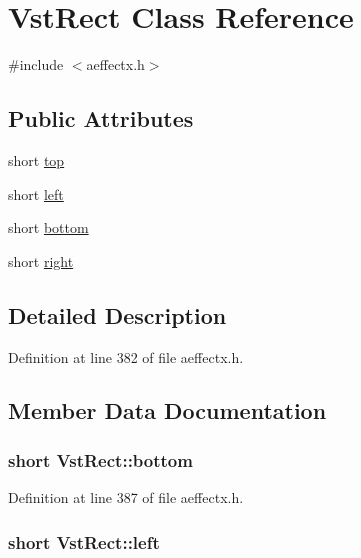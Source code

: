 \hypertarget{class_vst_rect}{}\section{Vst\+Rect Class Reference}
\label{class_vst_rect}


{\ttfamily \#include $<$aeffectx.\+h$>$}

\subsection*{Public Attributes}
\begin{DoxyCompactItemize}
\item 
short \hyperlink{class_vst_rect_a7f8eed550cd4a163997947b9840e6c69}{top}
\item 
short \hyperlink{class_vst_rect_a3659d8ec09583bb2e3f16c3f3e22b923}{left}
\item 
short \hyperlink{class_vst_rect_ae42659a383b39892184adf98f207da76}{bottom}
\item 
short \hyperlink{class_vst_rect_a134a7aa919791f2ffaad850853e0751d}{right}
\end{DoxyCompactItemize}


\subsection{Detailed Description}


Definition at line 382 of file aeffectx.\+h.



\subsection{Member Data Documentation}
\subsubsection[{\texorpdfstring{bottom}{bottom}}]{\setlength{\rightskip}{0pt plus 5cm}short Vst\+Rect\+::bottom}\hypertarget{class_vst_rect_ae42659a383b39892184adf98f207da76}{}\label{class_vst_rect_ae42659a383b39892184adf98f207da76}


Definition at line 387 of file aeffectx.\+h.

\subsubsection[{\texorpdfstring{left}{left}}]{\setlength{\rightskip}{0pt plus 5cm}short Vst\+Rect\+::left}\hypertarget{class_vst_rect_a3659d8ec09583bb2e3f16c3f3e22b923}{}\label{class_vst_rect_a3659d8ec09583bb2e3f16c3f3e22b923}


